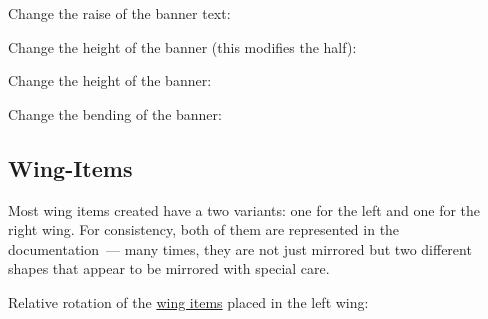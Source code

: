 \documentclass[parskip=half,english,numbers=noenddot,footnotes=nomultiple,oneside]{scrartcl}
\begin{document}
Change the raise of the banner text:
\begin{tcblisting}{}
\begin{tikzpicture}
	\pingu[banner, banner raise=2mm]
\end{tikzpicture}
\end{tcblisting}
\endsubkeyexplain

Change the height of the banner (this modifies the half):
\begin{tcblisting}{}
\begin{tikzpicture}
	\pingu[banner, banner height=6mm]
\end{tikzpicture}
\end{tcblisting}
\endsubkeyexplain

Change the height of the banner:
\begin{tcblisting}{}
\begin{tikzpicture}
	\pingu[banner, banner font=\itshape]
\end{tikzpicture}
\end{tcblisting}
\endsubkeyexplain

Change the bending of the banner:
\begin{tcblisting}{}
\begin{tikzpicture}
	\pingu[banner, banner bent=0]
\end{tikzpicture}
\end{tcblisting}
\endsubkeyexplain

\subsection{Wing-Items}
\label{sub:wing-items}Most wing items created have a two variants: one for the left and one for the right wing. For consistency, both of them are represented in the documentation~--- many times, they are not just mirrored but two different shapes that appear to be mirrored with special care.

	Relative rotation of the \hyperref[sub:wing-items]{wing items} placed in the left wing:
\begin{tcblisting}{}
\begin{tikzpicture}
	\pingu[cane left, cane right,
	       left wing item angle=70]
\end{tikzpicture}
\end{tcblisting}
\endkeyexplain
\end{document}
